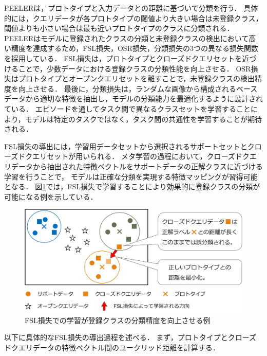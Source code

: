 \documentclass[a4paper,11pt,nomag]{jsreport}
\begin{document}
%
PEELERは，プロトタイプと入力データとの距離に基づいて分類を行う．
具体的には，クエリデータが各プロトタイプの閾値より大きい場合は未登録クラス，閾値よりも小さい場合は最も近いプロトタイプのクラスに分類される．
PEELERはモデルに登録されたクラスの分類と未登録クラスの検出において高い精度を達成するため，FSL損失，OSR損失，分類損失の3つの異なる損失関数を採用している．
FSL損失は，プロトタイプとクローズドクエリセットを近づけることで，少数データにおける登録クラスの分類性能を向上させる．
OSR損失はプロトタイプとオープンクエリセットを離すことで，未登録クラスの検出精度を向上させる．
最後に，分類損失は，ランダムな画像から構成されるベースデータから適切な特徴を抽出し，モデルの分類能力を最適化するように設計されている．
エピソードを通してタスク間で異なるクラスセットを学習することにより，モデルは特定のタスクではなく，タスク間の共通性を学習することが期待される．

FSL損失の導出には，学習用データセットから選択されるサポートセットとクローズドクエリセットが用いられる．
メタ学習の過程において，クローズドクエリデータから抽出された特徴ベクトルをサポートデータの正解クラスに近づける学習を行うことで，
モデルは正確な分類を実現する特徴マッピングが習得可能となる．
図\ref{fig:fsl_loss}では，FSL損失で学習することにより効果的に登録クラスの分類が可能になる例を示している．
% 
\begin{figure}[tbp]
  \centering
  \includegraphics[width=\linewidth, keepaspectratio]{image/fsl_loss.png}
  \caption{FSL損失での学習が登録クラスの分類精度を向上させる例}
  \label{fig:fsl_loss}
\end{figure}
% 
以下に具体的なFSL損失の導出過程を述べる．
まず，プロトタイプとクローズドクエリデータの特徴ベクトル間のユークリッド距離を計算する．
\end{document}
